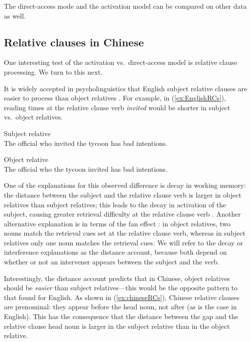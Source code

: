 \documentclass{cambridge7A}\usepackage[]{graphicx}\usepackage[]{color}
\begin{document}
The direct-access mode and the activation model can be compared on other data as well.

\subsection{Relative clauses in Chinese} \label{rchinese}

One interesting test of the activation vs.\ direct-access model is relative clause processing. We turn to this next.

It is widely accepted in psycholinguistics that  English subject relative clauses are easier to process than object relatives \citep[e.g.,][]{grodner}. For example, in (\ref{ex:EnglishRCs}), reading times at the relative clause verb \textit{invited} would be shorter in  subject vs.\ object relatives.

\begin{exe}
\ex  \label{ex:EnglishRCs}
\begin{xlist}
\item Subject relative\\
The official who invited the tycoon has bad intentions.
\item 
Object relative \\
The official who the tycoon invited has bad intentions.
\end{xlist}
\end{exe}

One of the explanations for this observed difference is decay in working memory: the distance between the subject and the relative clause verb is larger in object relatives than subject relatives; this leads to the decay in activation of the subject, causing greater retrieval difficulty at the relative clause verb \citep{Gibson2000}. Another alternative explanation is in terms of the fan effect \citep{LewisVasishth2005}: in object relatives, two nouns match the retrieval cues  set at the relative clause verb, whereas in subject relatives only one noun matches the retrieval cues. We will refer to the decay or interference explanations as the distance account, because both depend on whether or not an intervener appears between the subject and the verb.

Interestingly, the distance account predicts that in Chinese, object relatives should be \textit{easier} than subject relatives---this would be the opposite pattern to that found for English. As shown in (\ref{ex:chineseRCs}), Chinese relative clauses are prenominal: they appear before the head noun, not after (as is the case in English). This has the consequence that the distance between the  gap and the relative clause head noun is larger in the subject relative than in the object relative. 
\end{document}
